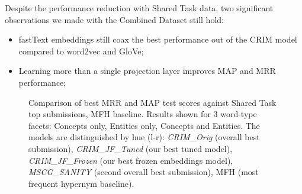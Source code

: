 Despite the performance reduction with Shared Task data, two significant observations we made with the Combined Dataset still hold:
\begin{itemize}
    \item fastText embeddings still coax the best performance out of the CRIM model compared to word2vec and GloVe;
    \item Learning more than a single projection layer improves \ac{MAP} and \ac{MRR} performance;
\end{itemize}
\begin{figure}[!ht]
    \centering
    \qquad
    \caption[Comparison of best MRR and MAP test scores against Shared Task top submissions, MFH baseline]{Comparison of best MRR and MAP test scores against Shared Task top submissions, MFH baseline. Results shown for 3 word-type facets: Concepts only, Entities only, Concepts and Entities.  The models are distinguished by hue (l-r): \textit{CRIM\_Orig} (overall best submission), \textit{CRIM\_JF\_Tuned} (our best tuned model), \textit{CRIM\_JF\_Frozen} (our best frozen embeddings model), \textit{MSCG\_SANITY} (second overall best submission), MFH (most frequent hypernym baseline).}
    \label{fig:jf_official_results}
\end{figure}

